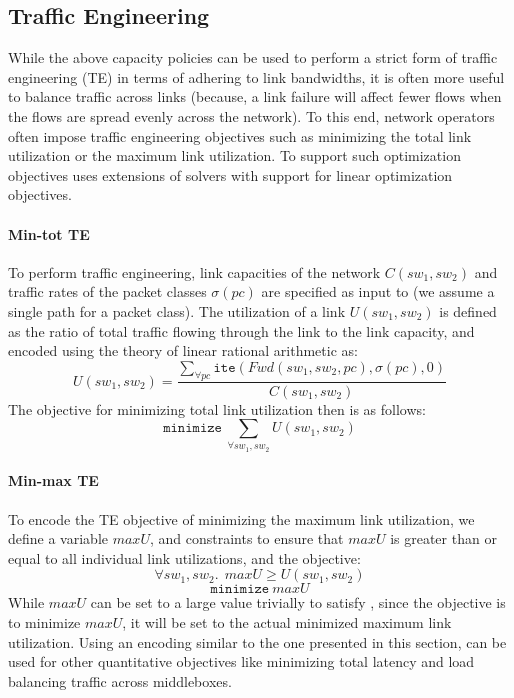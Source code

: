 \subsection{Traffic Engineering}
While the above capacity policies can be used to perform a strict form
of traffic engineering (TE) in terms of adhering to link bandwidths,
it is often more useful to balance traffic across links (because, a
link failure will affect fewer flows when the flows are spread evenly
across the network).  To this end, network operators often impose
traffic engineering objectives such as minimizing the total link
utilization or the maximum link utilization. To support such
optimization objectives \Name uses extensions of solvers with support
for linear optimization objectives.


\paragraph{Min-tot TE}
To perform traffic engineering, link capacities of the network $C(sw_1, sw_2)$ and traffic 
rates of the packet classes $\sigma(pc)$ are specified as input to \name (we assume a single
path for a packet class). The utilization 
of a link $U(sw_1, sw_2)$ is defined as the ratio of total traffic flowing through the link to the 
link capacity, and encoded using the theory of linear rational arithmetic as:
\begin{equation}
U(sw_1, sw_2) = \frac{\sum_{\forall pc} \texttt{ite}(Fwd(sw_1,sw_2, pc), \sigma(pc), 0)} {C(sw_1, sw_2)}
\end{equation}
The objective for minimizing total link utilization then is as follows:
\begin{equation}
	\texttt{minimize}\ \sum_{\forall sw_1, sw_2} U(sw_1, sw_2)
\end{equation}
\paragraph{Min-max TE}
To encode the TE objective of minimizing the maximum link utilization, we define
a variable $maxU$, and constraints to ensure that $maxU$ is greater than or equal to all 
individual link utilizations, and the objective: 
\begin{equation} \label{eq:maxu}
\forall sw_1, sw_2.\ \ maxU \geq U(sw_1, sw_2)
\end{equation} 
\begin{equation}
		\texttt{minimize}\ maxU
\end{equation}
While $maxU$ can be set to a large value trivially to satisfy , 
since the objective is to minimize $maxU$, it will be set to the actual
minimized maximum link utilization. Using an encoding similar to the one presented in this section, \name can be used for other
quantitative objectives like minimizing total latency and load balancing
traffic across middleboxes.

